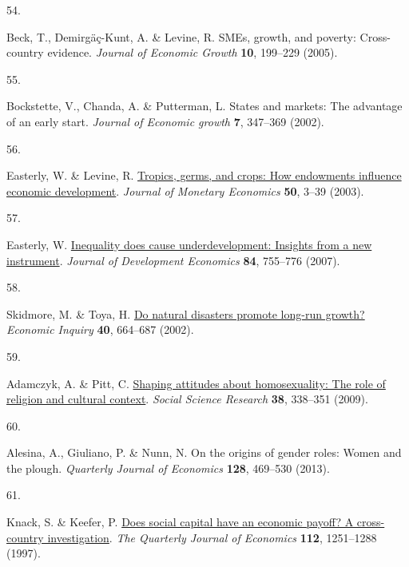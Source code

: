 \documentclass[
  man,floatsintext]{apa6}
\newlength{\cslhangindent}
\newlength{\csllabelwidth}
\newlength{\cslentryspacingunit} %
\newenvironment{CSLReferences}[2] %
 {%
  \setlength{\parindent}{0pt}
  \ifodd #1
  \let\oldpar\par
  \def\par{\hangindent=\cslhangindent\oldpar}
  \fi
  \setlength{\parskip}{#2\cslentryspacingunit}
 }%
 {}
\newcommand{\CSLLeftMargin}[1]{\parbox[t]{\csllabelwidth}{#1}}
\newcommand{\CSLRightInline}[1]{\parbox[t]{\linewidth - \csllabelwidth}{#1}\break}
\begin{document}
\begin{CSLReferences}{0}{0}
\leavevmode{}%
\CSLLeftMargin{54. }%
\CSLRightInline{Beck, T., Demirgäç-Kunt, A. \& Levine, R. {SME}s, growth, and poverty: Cross-country evidence. \emph{Journal of Economic Growth} \textbf{10}, 199--229 (2005).}

\leavevmode{}%
\CSLLeftMargin{55. }%
\CSLRightInline{Bockstette, V., Chanda, A. \& Putterman, L. States and markets: The advantage of an early start. \emph{Journal of Economic growth} \textbf{7}, 347--369 (2002).}

\leavevmode{}%
\CSLLeftMargin{56. }%
\CSLRightInline{Easterly, W. \& Levine, R. \href{https://doi.org/10.1016/S0304-3932(02)00200-3}{Tropics, germs, and crops: How endowments influence economic development}. \emph{Journal of Monetary Economics} \textbf{50}, 3--39 (2003).}

\leavevmode{}%
\CSLLeftMargin{57. }%
\CSLRightInline{Easterly, W. \href{https://doi.org/10.1016/j.jdeveco.2006.11.002}{Inequality does cause underdevelopment: Insights from a new instrument}. \emph{Journal of Development Economics} \textbf{84}, 755--776 (2007).}

\leavevmode{}%
\CSLLeftMargin{58. }%
\CSLRightInline{Skidmore, M. \& Toya, H. \href{https://doi.org/10.1093/ei/40.4.664}{Do natural disasters promote long-run growth?} \emph{Economic Inquiry} \textbf{40}, 664--687 (2002).}

\leavevmode{}%
\CSLLeftMargin{59. }%
\CSLRightInline{Adamczyk, A. \& Pitt, C. \href{https://doi.org/10.1016/j.ssresearch.2009.01.002}{Shaping attitudes about homosexuality: The role of religion and cultural context}. \emph{Social Science Research} \textbf{38}, 338--351 (2009).}

\leavevmode{}%
\CSLLeftMargin{60. }%
\CSLRightInline{Alesina, A., Giuliano, P. \& Nunn, N. On the origins of gender roles: Women and the plough. \emph{Quarterly Journal of Economics} \textbf{128}, 469--530 (2013).}

\leavevmode{}%
\CSLLeftMargin{61. }%
\CSLRightInline{Knack, S. \& Keefer, P. \href{https://doi.org/10.1162/003355300555475}{Does social capital have an economic payoff? A cross-country investigation}. \emph{The Quarterly Journal of Economics} \textbf{112}, 1251--1288 (1997).}


\end{CSLReferences}
\end{document}
